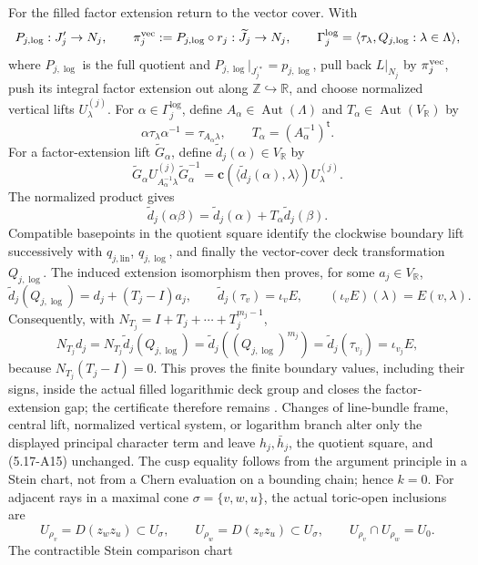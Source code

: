 \begin{enumerate}[leftmargin=1.8em]
For the filled factor extension return to the vector cover.  With
\[
 P_{j,\log}:J'_j\to N_j,\qquad
 \pi_j^{\rm vec}:=P_{j,\log}\circ r_j:\widetilde J_j\to N_j,
 \qquad
 \Gamma_j^{\log}
 =\langle\tau_\lambda,Q_{j,\log}:\lambda\in\Lambda\rangle,
\]
where \(P_{j,\log}\) is the full quotient and
\(P_{j,\log}|_{J_j^{\prime *}}=p_{j,\log}\), pull back
\(L|_{N_j}\) by \(\pi_j^{\rm vec}\), push its integral factor
extension out along \(\mathbb Z\hookrightarrow\mathbb R\), and choose
normalized vertical lifts \(U_\lambda^{(j)}\).  For
\(\alpha\in\Gamma_j^{\log}\), define
\(A_\alpha\in\operatorname{Aut}(\Lambda)\) and
\(T_\alpha\in\operatorname{Aut}(V_{\mathbb R})\) by
\[
 \alpha\tau_\lambda\alpha^{-1}=\tau_{A_\alpha\lambda},
 \qquad T_\alpha=(A_\alpha^{-1})^{\mathsf t}.
\]
For a factor-extension lift \(\widetilde G_\alpha\), define
\(\widetilde d_j(\alpha)\in V_{\mathbb R}\) by
\[
 \widetilde G_\alpha U_{A_\alpha^{-1}\lambda}^{(j)}
 \widetilde G_\alpha^{-1}
 =\mathbf c\!\left(\langle\widetilde d_j(\alpha),\lambda\rangle\right)
 U_\lambda^{(j)}.
\]
The normalized product gives
\[
 \widetilde d_j(\alpha\beta)
 =\widetilde d_j(\alpha)+T_\alpha\widetilde d_j(\beta).
\]
Compatible basepoints in the quotient square identify the clockwise
boundary lift successively with \(q_{j,\mathrm{lin}}\), \(q_{j,\log}\), and
finally the vector-cover deck transformation \(Q_{j,\log}\).  The induced
extension isomorphism then proves, for some \(a_j\in V_{\mathbb R}\),
\[
 \widetilde d_j(Q_{j,\log})=d_j+(T_j-I)a_j,
 \qquad
 \widetilde d_j(\tau_v)=\iota_vE,\qquad
 (\iota_vE)(\lambda)=E(v,\lambda).
\]
Consequently, with \(N_{T_j}=I+T_j+\cdots+T_j^{m_j-1}\),
\[
 N_{T_j}d_j
 =N_{T_j}\widetilde d_j(Q_{j,\log})
 =\widetilde d_j((Q_{j,\log})^{m_j})
 =\widetilde d_j(\tau_{v_j})=\iota_{v_j}E,
\]
because \(N_{T_j}(T_j-I)=0\).  This proves the finite boundary values,
including their signs, inside the actual filled logarithmic deck group and
closes the factor-extension gap; the certificate therefore remains
{\Verified}.  Changes of line-bundle frame, central lift, normalized
vertical system, or logarithm branch alter only the displayed principal
character term and leave \(h_j,\bar h_j\), the quotient square, and
(5.17-A15) unchanged.
The cusp equality follows from the argument principle in a Stein chart, not
from a Chern evaluation on a bounding chain; hence \(k=0\).  For adjacent
rays in a maximal cone
\(\sigma=\{v,w,u\}\), the actual toric-open inclusions are
\[
 U_{\rho_v}=D(z_wz_u)\subset U_\sigma,\qquad
 U_{\rho_w}=D(z_vz_u)\subset U_\sigma,\qquad
 U_{\rho_v}\cap U_{\rho_w}=U_0.
\]
The contractible Stein comparison chart

\end{enumerate}
